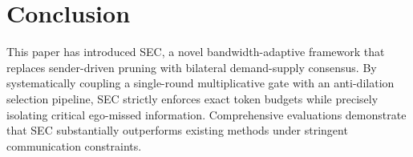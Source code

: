 \section{Conclusion}
\label{sec:conclusion}
This paper has introduced SEC, a novel bandwidth-adaptive framework that replaces sender-driven pruning with bilateral demand-supply consensus. By systematically coupling a single-round multiplicative gate with an anti-dilation selection pipeline, SEC strictly enforces exact token budgets while precisely isolating critical ego-missed information. Comprehensive evaluations demonstrate that SEC substantially outperforms existing methods under stringent communication constraints.
